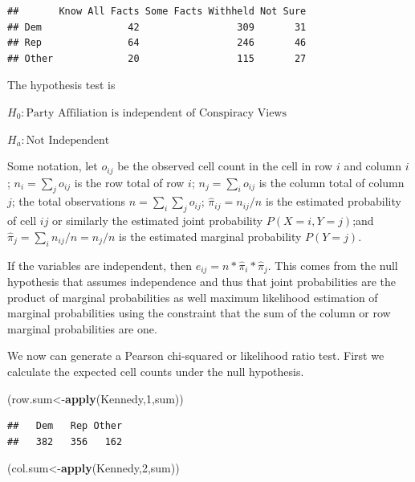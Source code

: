 \documentclass[]{book}
\newenvironment{Shaded}{\begin{snugshade}}{\end{snugshade}}
\newcommand{\KeywordTok}[1]{\textcolor[rgb]{0.13,0.29,0.53}{\textbf{#1}}}
\newcommand{\DecValTok}[1]{\textcolor[rgb]{0.00,0.00,0.81}{#1}}
\newcommand{\NormalTok}[1]{#1}
\theoremstyle{definition}
\theoremstyle{definition}
\theoremstyle{definition}
\theoremstyle{remark}
\begin{document}
\begin{verbatim}
##       Know All Facts Some Facts Withheld Not Sure
## Dem               42                 309       31
## Rep               64                 246       46
## Other             20                 115       27
\end{verbatim}

The hypothesis test is

\(H_{0}: \mbox{Party Affiliation is independent of Conspiracy Views}\)

\(H_{a}: \mbox{Not Independent}\)

Some notation, let \(o_{ij}\) be the observed cell count in the cell in
row \(i\) and column \(i\); \(n_{i}=\sum_{j}o_{ij}\) is the row total of
row \(i\); \(n_{j}=\sum_{i}o_{ij}\) is the column total of column \(j\);
the total observations \(n=\sum_{i}\sum_{j}o_{ij}\);
\(\hat{\pi}_{ij}=n_{ij}/n\) is the estimated probability of cell \(ij\)
or similarly the estimated joint probability \(P(X=i,Y=j)\);and
\(\hat{\pi}_{j}=\sum_{i}n_{ij}/n=n_{j}/n\) is the estimated marginal
probability \(P(Y=j)\).

If the variables are independent, then
\(e_{ij}=n*\hat{\pi}_{i}*\hat{\pi}_{j}\). This comes from the null
hypothesis that assumes independence and thus that joint probabilities
are the product of marginal probabilities as well maximum likelihood
estimation of marginal probabilities using the constraint that the sum
of the column or row marginal probabilities are one.

We now can generate a Pearson chi-squared or likelihood ratio test.
First we calculate the expected cell counts under the null hypothesis.

\begin{Shaded}
\begin{Highlighting}[]
\NormalTok{(row.sum<-}\KeywordTok{apply}\NormalTok{(Kennedy,}\DecValTok{1}\NormalTok{,sum))}
\end{Highlighting}
\end{Shaded}

\begin{verbatim}
##   Dem   Rep Other 
##   382   356   162
\end{verbatim}

\begin{Shaded}
\begin{Highlighting}[]
\NormalTok{(col.sum<-}\KeywordTok{apply}\NormalTok{(Kennedy,}\DecValTok{2}\NormalTok{,sum))}
\end{Highlighting}
\end{Shaded}
\end{document}
